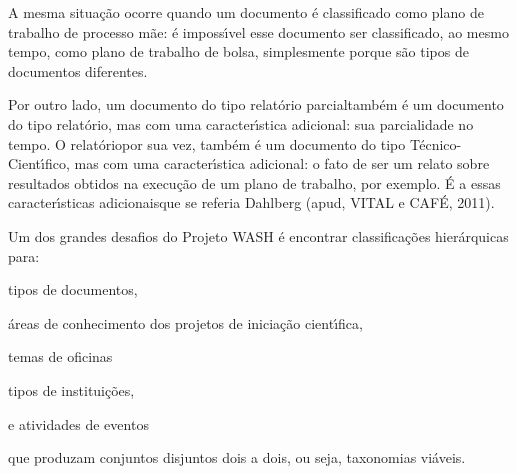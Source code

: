\documentclass[
12pt,		%
openright,	%
twoside,  %
a4paper,			%
chapter=TITLE,		%
english,			%
french,				%
spanish,			%
brazil				%
]{USPSC-classe/USPSC}
\begin{document}
A mesma situa\c{c}\~ao ocorre quando um documento \'e classificado como \textquotedbl plano de trabalho de processo m\~ae\textquotedbl : \'e imposs\'{\i}vel esse documento ser classificado, ao mesmo tempo, como \textquotedbl plano de trabalho de bolsa\textquotedbl , simplesmente porque s\~ao tipos de documentos diferentes.










Por outro lado, um documento do tipo \textquotedbl relat\'orio parcial\textquotedbl  tamb\'em \'e um documento do tipo \textquotedbl relat\'orio\textquotedbl , mas com uma caracter\'{\i}stica adicional: sua parcialidade no tempo. O \textquotedbl relat\'orio\textquotedbl  por sua vez, tamb\'em \'e um documento do tipo \textquotedbl T\'ecnico-Cient\'{\i}fico\textquotedbl , mas com uma caracter\'{\i}stica adicional: o fato de ser um relato sobre resultados obtidos na execu\c{c}\~ao de um plano de trabalho, por exemplo. \'E a essas \textquotedbl caracter\'{\i}sticas adicionais\textquotedbl  que se referia Dahlberg  (apud, VITAL e CAF\'E, 2011).










Um dos grandes desafios do Projeto WASH \'e encontrar classifica\c{c}\~oes hier\'arquicas para:











\begin{alineas}
\item \textquotedbl tipos de documentos\textquotedbl ,
\item \textquotedbl \'areas de conhecimento dos projetos de inicia\c{c}\~ao cient\'{\i}fica\textquotedbl ,
\item \textquotedbl temas de oficinas\textquotedbl 
\item \textquotedbl tipos de institui\c{c}\~oes\textquotedbl ,
\item e \textquotedbl atividades de eventos\textquotedbl 
\end{alineas}

que produzam conjuntos disjuntos dois a dois, ou seja, taxonomias vi\'aveis.
\end{document}
